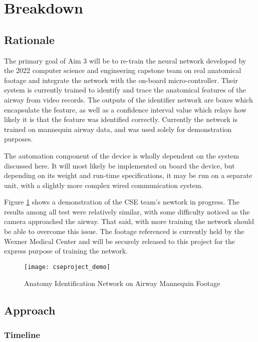 \section{Breakdown}

\subsection{Rationale}

	The primary goal of Aim 3 will be to re-train the neural network developed by the 2022 computer science and engineering capstone team on real anatomical footage and integrate the network with the on-board micro-controller. Their system is currently trained to identify and trace the anatomical features of the airway from video records. The outputs of the identifier network are boxes which encapsulate the feature, as well as a confidence interval value which relays how likely it is that the feature was identified correctly. Currently the network is trained on mannequin airway data, and was used solely for demonstration purposes.

	The automation component of the device is wholly dependent on the system discussed here. It will most likely be implemented on board the device, but depending on its weight and run-time specifications, it may be run on a separate unit, with a slightly more complex wired communication system.
	
	Figure \ref{fig:cseproject_demo} shows a demonstration of the CSE team's newtork in progress. The results among all test were relatively similar, with some difficulty noticed as the camera approached the airway. That said, with more training the network should be able to overcome this issue. The footage referenced is currently held by the Wexner Medical Center and will be securely released to this project for the express purpose of training the network.
	
	\begin{figure}[ht]
		\centering
		\texttt{[image: cseproject\_demo]}
		\caption{Anatomy Identification Network on Airway Mannequin Footage}
		\label{fig:cseproject_demo}
	\end{figure}

\subsection{Approach}

	\subsubsection{Timeline}
	
